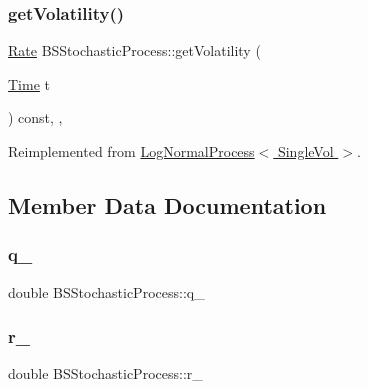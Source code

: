 \hypertarget{class_b_s_stochastic_process_ad20afb9e82ee123452a7d828837289f6}{}\label{class_b_s_stochastic_process_ad20afb9e82ee123452a7d828837289f6} 
\subsubsection{\texorpdfstring{get\+Volatility()}{getVolatility()}\hspace{0.1cm}{\footnotesize\ttfamily [2/2]}}
{\footnotesize\ttfamily \hyperlink{_name_def_8h_a25bee43a162de339c81f3d1caf6b887d}{Rate} B\+S\+Stochastic\+Process\+::get\+Volatility (\begin{DoxyParamCaption}\item[{\hyperlink{_name_def_8h_ac2d3e0ba793497bcca555c7c2cf64ff3}{Time}}]{t }\end{DoxyParamCaption}) const\hspace{0.3cm}{\ttfamily [inline]}, {\ttfamily [override]}, {\ttfamily [virtual]}}



Reimplemented from \hyperlink{class_log_normal_process_af2d153f75cd5efbeaa3a9028585dd835}{Log\+Normal\+Process$<$ Single\+Vol $>$}.



\subsection{Member Data Documentation}
\hypertarget{class_b_s_stochastic_process_a5f8464c5c964643c947cb5cdc4d6a016}{}\label{class_b_s_stochastic_process_a5f8464c5c964643c947cb5cdc4d6a016} 
\subsubsection{\texorpdfstring{q\+\_\+}{q\_}}
{\footnotesize\ttfamily double B\+S\+Stochastic\+Process\+::q\+\_\+}

\hypertarget{class_b_s_stochastic_process_a9c68fc36f4fceb55eb3b7b812060a391}{}\label{class_b_s_stochastic_process_a9c68fc36f4fceb55eb3b7b812060a391} 
\subsubsection{\texorpdfstring{r\+\_\+}{r\_}}
{\footnotesize\ttfamily double B\+S\+Stochastic\+Process\+::r\+\_\+}

